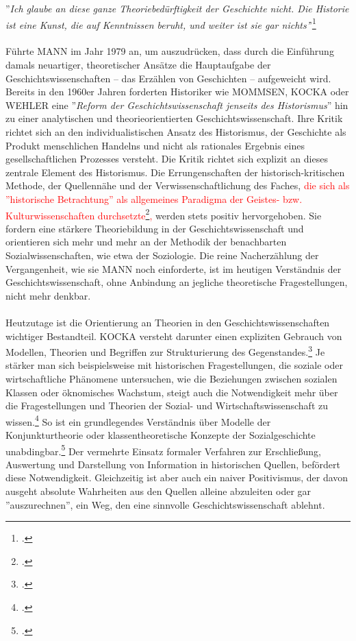 \documentclass[12pt,a4paper]{article}
\begin{document}
''\textit{Ich glaube an diese ganze Theoriebedürftigkeit der Geschichte nicht. Die Historie ist eine Kunst, die auf Kenntnissen beruht, und weiter ist sie gar nichts'}'\footcite[][S.53]{mann1979pladoyer}
\\
\\
Führte MANN im Jahr 1979 an, um auszudrücken, dass durch die Einführung damals neuartiger, theoretischer Ansätze die Hauptaufgabe der Geschichtswissenschaften --  das Erzählen von Geschichten -- aufgeweicht wird. Bereits in den 1960er Jahren forderten Historiker wie MOMMSEN, KOCKA oder WEHLER eine ''\textit{Reform der Geschichtswissenschaft jenseits des Historismus}'' hin zu einer analytischen und theorieorientierten Geschichtswissenschaft. Ihre Kritik richtet sich an den individualistischen Ansatz des Historismus, der Geschichte als Produkt menschlichen Handelns und nicht als rationales Ergebnis eines gesellschaftlichen Prozesses versteht. Die Kritik richtet sich explizit an dieses zentrale Element des Historismus. Die Errungenschaften der historisch-kritischen Methode, der Quellennähe und der Verwissenschaftlichung des Faches, \textcolor{red}{die sich als ''historische Betrachtung'' als allgemeines Paradigma der Geistes- bzw. Kulturwissenschaften durchsetzte\footcite[][S.28]{hardtwig1990geschichtskultur},} werden stets positiv hervorgehoben. Sie fordern eine stärkere Theoriebildung in der Geschichtswissenschaft und orientieren sich mehr und mehr an der Methodik der benachbarten Sozialwissenschaften, wie etwa der Soziologie. Die reine Nacherzählung der Vergangenheit, wie sie MANN noch einforderte, ist im heutigen Verständnis der Geschichtswissenschaft, ohne Anbindung an jegliche theoretische Fragestellungen, nicht mehr denkbar.
\\
\\
Heutzutage ist die Orientierung an Theorien in den Geschichtswissenschaften wichtiger Bestandteil. KOCKA versteht darunter einen expliziten Gebrauch von Modellen, Theorien und Begriffen zur Strukturierung des Gegenstandes.\footcite[][S.2]{magerski2009schreibt} Je stärker man sich beispielsweise mit historischen Fragestellungen, die soziale oder wirtschaftliche Phänomene untersuchen, wie die Beziehungen zwischen sozialen Klassen oder öknomisches Wachstum, steigt auch die Notwendigkeit mehr über die Fragestellungen und Theorien der Sozial- und Wirtschaftswissenschaft zu wissen.\footcite[][S.6-8]{kocka1982theorien} So ist ein grundlegendes Verständnis über Modelle der Konjunkturtheorie oder klassentheoretische Konzepte der Sozialgeschichte unabdingbar.\footcite[][S.1]{sokollgrundlagen} Der vermehrte Einsatz formaler Verfahren zur Erschließung, Auswertung und Darstellung von Information in historischen Quellen, befördert diese Notwendigkeit. Gleichzeitig ist aber auch ein naiver Positivismus, der davon ausgeht absolute Wahrheiten aus den Quellen alleine abzuleiten oder gar ''auszurechnen'', ein Weg, den eine sinnvolle Geschichtswissenschaft ablehnt.
\end{document}
